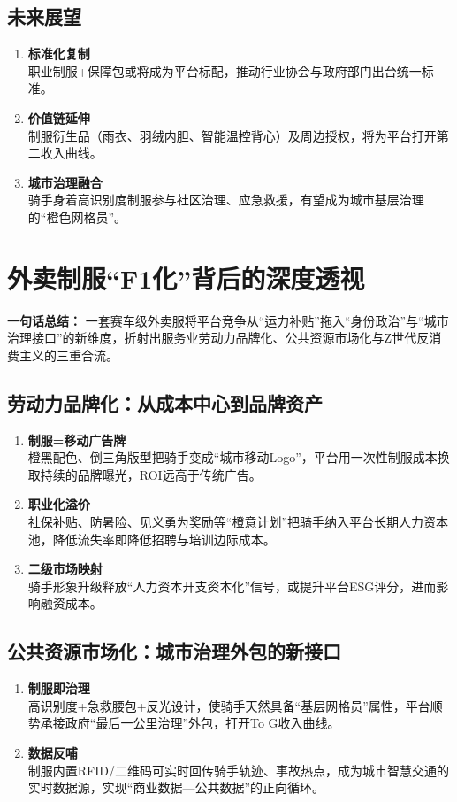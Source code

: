 \subsection{未来展望}
\begin{enumerate}[leftmargin=*, nosep]
    \item \textbf{标准化复制}  \\
    职业制服+保障包或将成为平台标配，推动行业协会与政府部门出台统一标准。
    \item \textbf{价值链延伸}  \\
    制服衍生品（雨衣、羽绒内胆、智能温控背心）及周边授权，将为平台打开第二收入曲线。
    \item \textbf{城市治理融合}  \\
    骑手身着高识别度制服参与社区治理、应急救援，有望成为城市基层治理的“橙色网格员”。
\end{enumerate}


\section{外卖制服“F1化”背后的深度透视}
\textbf{一句话总结：}  
一套赛车级外卖服将平台竞争从“运力补贴”拖入“身份政治”与“城市治理接口”的新维度，折射出服务业劳动力品牌化、公共资源市场化与Z世代反消费主义的三重合流。

\subsection{劳动力品牌化：从成本中心到品牌资产}
\begin{enumerate}[leftmargin=*, nosep]
    \item \textbf{制服=移动广告牌}  \\
    橙黑配色、倒三角版型把骑手变成“城市移动Logo”，平台用一次性制服成本换取持续的品牌曝光，ROI远高于传统广告。
    \item \textbf{职业化溢价}  \\
    社保补贴、防暑险、见义勇为奖励等“橙意计划”把骑手纳入平台长期人力资本池，降低流失率即降低招聘与培训边际成本。
    \item \textbf{二级市场映射}  \\
    骑手形象升级释放“人力资本开支资本化”信号，或提升平台ESG评分，进而影响融资成本。
\end{enumerate}

\subsection{公共资源市场化：城市治理外包的新接口}
\begin{enumerate}[leftmargin=*, nosep]
    \item \textbf{制服即治理}  \\
    {\color{red}高识别度+急救腰包+反光设计，使骑手天然具备“基层网格员”属性，平台顺势承接政府“最后一公里治理”外包，打开To G收入曲线。}
    \item \textbf{数据反哺}  \\
    {\color{red}制服内置RFID/二维码可实时回传骑手轨迹、事故热点，成为城市智慧交通的实时数据源，实现“商业数据—公共数据”的正向循环。}
\end{enumerate}

